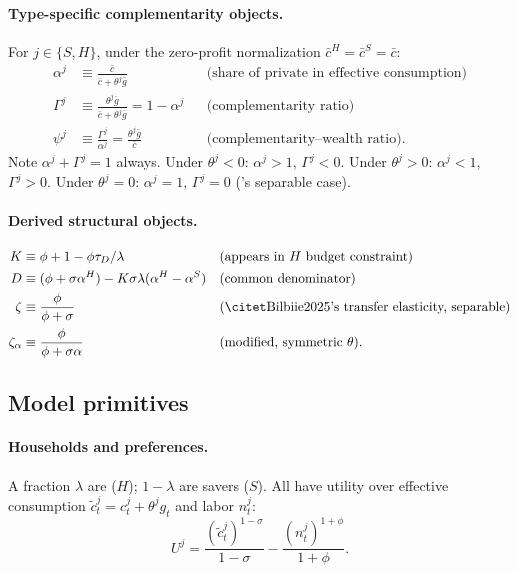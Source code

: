 \paragraph{Type-specific complementarity objects.}
For $j\in\{S,H\}$, under the zero-profit normalization $\bar c^{H}=\bar c^{S}=\bar c$:
\begin{align*}
  \alpha^{j} &\equiv \frac{\bar c}{\bar c + \theta^{j}\bar g}
    && \text{(share of private in effective consumption)}\\
  \Gamma^{j} &\equiv \frac{\theta^{j}\bar g}{\bar c+\theta^{j}\bar g}=1-\alpha^{j}
    && \text{(complementarity ratio)}\\
  \psi^{j} &\equiv \frac{\Gamma^{j}}{\alpha^{j}}=\frac{\theta^{j}\bar g}{\bar c}
    && \text{(complementarity--wealth ratio)}.
\end{align*}
Note $\alpha^{j}+\Gamma^{j}=1$ always. Under $\theta^{j}<0$: $\alpha^{j}>1$,
$\Gamma^{j}<0$. Under $\theta^{j}>0$: $\alpha^{j}<1$, $\Gamma^{j}>0$. Under
$\theta^{j}=0$: $\alpha^{j}=1$, $\Gamma^{j}=0$ (\bilbiie{}'s separable case).

\paragraph{Derived structural objects.}
\begin{align*}
  K &\equiv \phi + 1 - \phi\tau_{D}/\lambda
    && \text{(appears in $H$ budget constraint)}\\
  D &\equiv (\phi+\sigma\alpha^{H}) - K\sigma\lambda(\alpha^{H}-\alpha^{S})
    && \text{(common denominator)}\\
  \zeta &\equiv \frac{\phi}{\phi+\sigma}
    && \text{(\bilbiie{}'s transfer elasticity, separable)}\\
  \zeta_{\alpha} &\equiv \frac{\phi}{\phi+\sigma\alpha}
    && \text{(modified, symmetric $\theta$)}.
\end{align*}

\subsection{Model primitives}\label{app:primitives}

\paragraph{Households and preferences.}
A fraction $\lambda$ are \HtM{} ($H$); $1-\lambda$ are savers ($S$). All have
utility over effective consumption $\tilde c^{j}_{t}=c^{j}_{t}+\theta^{j}g_{t}$
and labor $n^{j}_{t}$:
\[
  U^{j}=\frac{(\tilde c^{j}_{t})^{1-\sigma}}{1-\sigma}-\frac{(n^{j}_{t})^{1+\phi}}{1+\phi}.
\]

